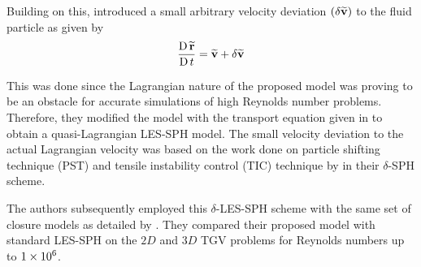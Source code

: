 Building on this, \cite{Colagrossi2021QuasiLagrangian} introduced a small arbitrary velocity deviation $(\delta\widetilde{\mathbf{v}})$ to the fluid particle as given by
\begin{equation}
    \frac{\operatorname{D} \widetilde{\mathbf{r}}}{\operatorname{D} t} = \widetilde{\mathbf{v}} + \delta\widetilde{\mathbf{v}} 
    \label{eq:Colagrossi2021QuasiLagrangian-r-transport}
\end{equation}

This was done since the Lagrangian nature of the proposed model was proving to be an obstacle for accurate simulations of high Reynolds number problems. Therefore, they modified the model with the transport equation given in  to obtain a quasi-Lagrangian LES-SPH model. The small velocity deviation to the actual Lagrangian velocity was based on the work done on particle shifting technique (PST) and tensile instability control (TIC) technique by \cite{sun2018multi} in their $\delta$-SPH scheme.

The authors subsequently employed this $\delta$-LES-SPH scheme with the same set of closure models as detailed by \cite{DiMascio2017}. They compared their proposed model with standard LES-SPH on the $2D$ and $3D$ TGV problems for Reynolds numbers up to $1 \times {10}^{6}$.

